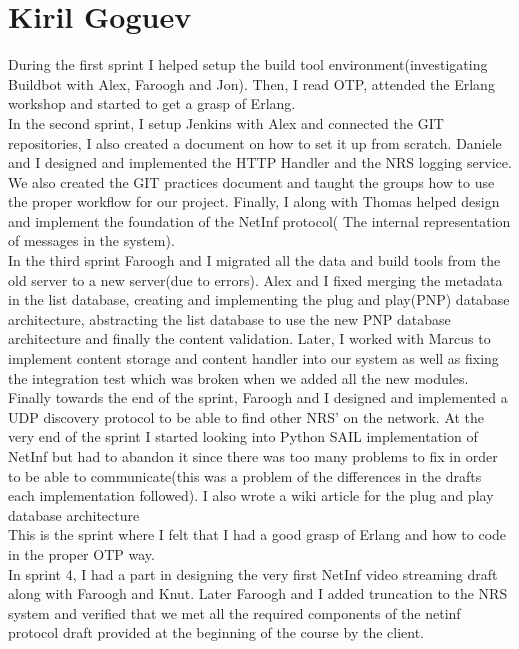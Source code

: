 \section{Kiril Goguev}

During the first sprint I helped setup the build tool environment(investigating Buildbot with Alex, Faroogh and Jon). Then, I read OTP, attended the Erlang workshop and started to get a grasp of Erlang.\\

In the second sprint, I setup Jenkins with Alex and connected the GIT repositories, I also created a document on how to set it up from scratch. 
Daniele and I designed and implemented the HTTP Handler and the NRS logging service. We also created the GIT practices document and taught the groups how to use the proper workflow for our project. Finally,
I along with Thomas helped design and implement the foundation of the NetInf protocol( The internal representation of messages in the system).\\


In the third sprint
Faroogh and I migrated all the data and build tools from the old server to a new server(due to errors).
Alex and I fixed merging the metadata in the list database, creating and implementing the plug and play(PNP) database architecture, abstracting the list database to use the new PNP database architecture and finally the content validation. 
Later, I worked with Marcus to implement content storage and content handler into our system as well as fixing the integration test which was broken when we added all the new modules. 
Finally towards the end of the sprint, Faroogh and I designed and implemented a UDP discovery protocol to be able to find other NRS' on the network.
At the very end of the sprint I started looking into Python SAIL implementation of NetInf but had to abandon it since there was too many problems to fix in order to be able to communicate(this was a problem of the differences in the drafts each implementation followed). 
I also wrote a wiki article for the plug and play database architecture\\

This is the sprint where I felt that I had a good grasp of Erlang and how to code in the proper OTP way. \\

In sprint 4,
I had a part in designing the very first NetInf video streaming draft along with Faroogh and Knut. 
Later Faroogh and I added truncation to the NRS system and verified that we met all the required components of the netinf protocol draft provided at the beginning of the course by the client. \\

